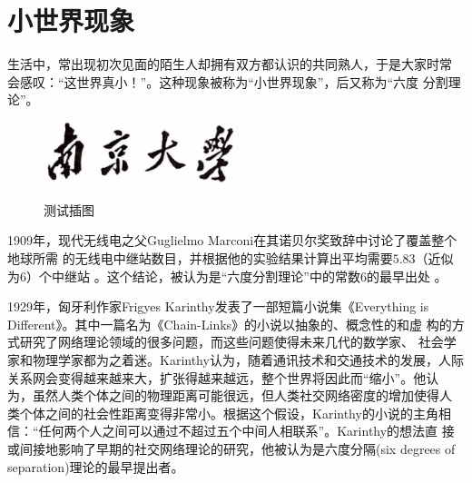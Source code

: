 \documentclass[oneside, phd]{njuthesis}
\begin{document}
\section{小世界现象}

生活中，常出现初次见面的陌生人却拥有双方都认识的共同熟人，于是大家时常
会感叹：“这世界真小！”。这种现象被称为``小世界现象''，后又称为``六度
分割理论''。

\begin{figure}[htbp]
  \centering
  \includegraphics[width= 0.5\textwidth]{njuname.eps}\\
  \caption{测试插图}\label{fig:test2}
\end{figure}

1909年，现代无线电之父Guglielmo Marconi在其诺贝尔奖致辞中讨论了覆盖整个地球所需
的无线电中继站数目，并根据他的实验结果计算出平均需要$5.83$（近似为$6$）个中继站
\cite{marconi1909nobel}。这个结论，被认为是``六度分割理论''中的常数$6$的最早出处
\cite{barabasi2003linked}。

1929年，匈牙利作家Frigyes Karinthy发表了一部短篇小说集《Everything is
  Different》。其中一篇名为《Chain-Links》的小说以抽象的、概念性的和虚
构的方式研究了网络理论领域的很多问题，而这些问题使得未来几代的数学家、
社会学家和物理学家都为之着迷\cite{newman2006structure,
  barabasi2003linked}。Karinthy认为，随着通讯技术和交通技术的发展，人际
关系网会变得越来越来大，扩张得越来越远，整个世界将因此而``缩小''。他认
为，虽然人类个体之间的物理距离可能很远，但人类社交网络密度的增加使得人
类个体之间的社会性距离变得非常小。根据这个假设，Karinthy的小说的主角相
信：``任何两个人之间可以通过不超过五个中间人相联系''。Karinthy的想法直
接或间接地影响了早期的社交网络理论的研究，他被认为是六度分隔(six
degrees of separation)理论的最早提出者\cite{barabasi2003linked}。
\end{document}
